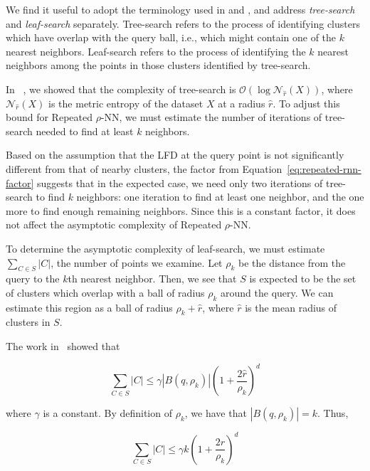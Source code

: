 We find it useful to adopt the terminology used in \cite{ishaq2019clustered} and \cite{yu2015entropy}, and address \emph{tree-search} and \emph{leaf-search} separately.
Tree-search refers to the process of identifying clusters which have overlap with the query ball, i.e., which might contain one of the $k$ nearest neighbors. 
Leaf-search refers to the process of identifying the $k$ nearest neighbors among the points in those clusters identified by tree-search.

In ~\cite{ishaq2019clustered}, we showed that the complexity of tree-search is $\mathcal{O}(\log\mathcal{N}_{\hat{r}}(X))$, where $\mathcal{N}_{\hat{r}}(X)$ is the metric entropy of the dataset $X$ at a radius $\hat{r}$.
To adjust this bound for Repeated $\rho$-NN, we must estimate the number of iterations of tree-search needed to find at least $k$ neighbors.

Based on the assumption that the LFD at the query point is not significantly different from that of nearby clusters, the factor from Equation~\ref{eq:repeated-rnn-factor} suggests that in the expected case, we need only two iterations of tree-search to find $k$ neighbors:
one iteration to find at least one neighbor, and the one more to find enough remaining neighbors.
Since this is a constant factor, it does not affect the asymptotic complexity of Repeated $\rho$-NN.

To determine the asymptotic complexity of leaf-search, we must estimate $\sum_{C \in S} |C|$, the number of points we examine.
Let $\rho_k$ be the distance from the query to the $k$th nearest neighbor.
Then, we see that $S$ is expected to be the set of clusters which overlap with a ball of radius $\rho_k$ around the query.
We can estimate this region as a ball of radius $\rho_k + \hat{r}$, where $\hat{r}$ is the mean radius of clusters in $S$.

The work in~\cite{yu2015entropy} showed that

\begin{equation*}
    \sum_{C \in S} |C| \leq \gamma  \left| B(q, \rho_k) \right| \left(1+ \frac{2\hat{r}}{\rho_k} \right)^d
\end{equation*}

where $\gamma$ is a constant. 
By definition of $\rho_k$, we have that $|B(q, \rho_k)| = k$.
Thus,

\begin{equation}
    \sum_{C \in S} |C| \leq \gamma k \left( 1+ \frac{2\hat{r}}{\rho_k} \right)^d
    \label{eq:methods:repeated-rnn-leaf-search}
\end{equation}

